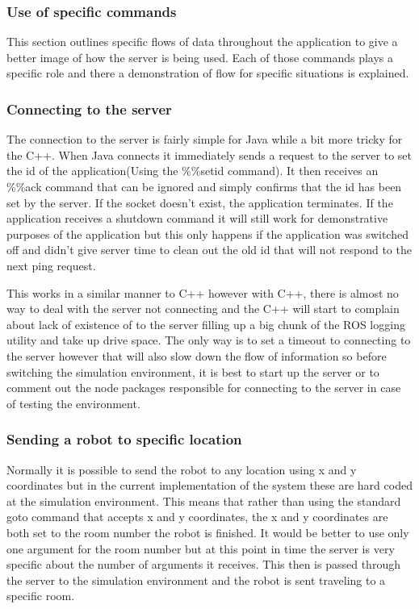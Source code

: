     \subsubsection{Use of specific commands}
      This section outlines specific flows of data throughout the application to give a better image of how the server is being used. Each of those commands plays a specific role and there a demonstration of flow for specific situations is explained.

      \subsubsection{Connecting to the server}
        The connection to the server is fairly simple for Java while a bit more tricky for the C++. When Java connects it immediately sends a request to the server to set the id of the application(Using the \%\%setid command). It then receives an \%\%ack command that can be ignored and simply confirms that the id has been set by the server. If the socket doesn't exist, the application terminates. If the application receives a shutdown command it will still work for demonstrative purposes of the application but this only happens if the application was switched off and didn't give server time to clean out the old id that will not respond to the next ping request.

        This works in a similar manner to C++ however with C++, there is almost no way to deal with the server not connecting and the C++ will start to complain about lack of existence of to the server filling up a big chunk of the ROS logging utility and take up drive space. The only way is to set a timeout to connecting to the server however that will also slow down the flow of information so before switching the simulation environment, it is best to start up the server or to comment out the node packages responsible for connecting to the server in case of testing the environment.

      \subsubsection{Sending a robot to specific location}
        Normally it is possible to send the robot to any location using x and y coordinates but in the current implementation of the system these are hard coded at the simulation environment. This means that rather than using the standard goto command that accepts x and y coordinates, the x and y coordinates are both set to the room number the robot is finished. It would be better to use only one argument for the room number but at this point in time the server is very specific about the number of arguments it receives. This then is passed through the server to the simulation environment and the robot is sent traveling to a specific room.

